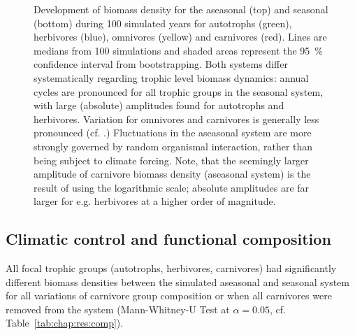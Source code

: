 \begin{figure}[h!]
\centering

\caption[Log-body mass density time series for \textit{exp. 1} in both systems]{Development of biomass density for the aseasonal (top) and seasonal (bottom) during 100 simulated years for autotrophs (green), herbivores (blue), omnivores (yellow) and carnivores (red). Lines are medians from 100 simulations and shaded areas represent the 95~\% confidence interval from bootstrapping. Both systems differ systematically regarding trophic level biomass dynamics: annual cycles are pronounced for all trophic groups in the seasonal system, with large (absolute) amplitudes found for autotrophs and herbivores. Variation for omnivores and carnivores is generally less pronounced (cf. .) Fluctuations in the aseasonal system are more strongly governed by random organismal interaction, rather than being subject to climate forcing. Note, that the seemingly larger amplitude of carnivore biomass density (aseasonal system) is the result of using the logarithmic scale; absolute amplitudes are far larger for e.g. herbivores at a higher order of magnitude. }
\label{fig:chap:res:ts:expno1}
\end{figure}

\subsection{Climatic control and functional composition}
\label{chap:res:diff}
All focal trophic groups (autotrophs, herbivores, carnivores) had significantly different biomass densities between the simulated aseasonal and seasonal system for all variations of carnivore group composition or when all carnivores were removed from the system (Mann-Whitney-U Test at $\alpha = 0.05$, cf. Table~\ref{tab:chap:res:comp}).\\\\

